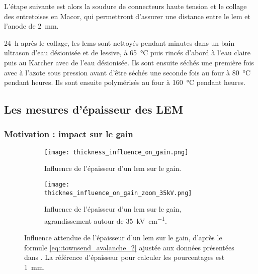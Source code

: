             L'étape suivante est alors la soudure de connecteurs haute tension et le collage des entretoises en Macor, qui permettront d'assurer une distance entre le \gls{lem} et l'anode de \SI{2}{\milli\meter}.
            
            \SI{24}{\hour} après le collage, les \glspl{lem} sont nettoyés pendant  minutes dans un bain ultrason d'eau désionisée et de lessive, à \SI{65}{\celsius} puis rincés d'abord à l'eau claire puis au Karcher avec de l'eau désionisée. Ils sont ensuite séchés une première fois avec à l'azote sous pression avant d'être séchés une seconde fois au four à \SI{80}{\celsius} pendant  heures. Ils sont ensuite polymérisés au four à \SI{160}{\celsius} pendant  heures.
        
        \subsection{Les mesures d’épaisseur des LEM}\label{sec::epaisseur}
        
            \subsubsection{Motivation : impact sur le gain}
            
                \begin{figure}[htbp]
                    \begin{subfigure}[t]{0.48\textwidth}
                        \texttt{[image: thickness\_influence\_on\_gain.png]}
                        \caption{Influence de l'épaisseur d'un \gls{lem} sur le gain.}
                    \end{subfigure}
                    \hfill
                    \begin{subfigure}[t]{0.48\textwidth}
                        \texttt{[image: thicknes\_influence\_on\_gain\_zoom\_35kV.png]}
                        \caption{Influence de l'épaisseur d'un \gls{lem} sur le gain, agrandissement autour de \SI{35}{\kilo\volt\per\centi\meter}.}
                    \end{subfigure}
                    \caption[Influence de l'épaisseur d'un \gls{lem} sur le gain.]{Influence attendue de l'épaisseur d'un \gls{lem} sur le gain, d'après le formule \eqref{eq::townsend_avalanche_2} ajustée aux données présentées dans \cite{Cantini2014}. La référence d'épaisseur pour calculer les pourcentages est \SI{1}{\milli\meter}.}
                    \label{fig::thickness_influence_on_gain}
                \end{figure}
            
